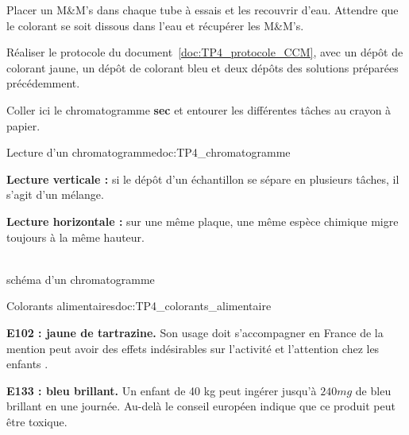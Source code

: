 \mesure
Placer un M\&M's dans chaque tube à essais et les recouvrir d'eau.
Attendre que le colorant se soit dissous dans l'eau et récupérer les M\&M's.

\mesure
Réaliser le protocole du document~\ref{doc:TP4_protocole_CCM}, avec un dépôt de colorant jaune, un dépôt de colorant bleu et deux dépôts des solutions préparées précédemment.

\mesure
Coller ici le chromatogramme \textbf{sec} et entourer les différentes tâches au crayon à papier.
\vspace*{240pt}




\begin{doc}{Lecture d'un chromatogramme}{doc:TP4_chromatogramme}
  \begin{multicols}{2}
    \begin{listePoints}
      \item \textbf{Lecture verticale :} si le dépôt d'un échantillon se sépare en plusieurs tâches, il s'agit d'un mélange.
      \item \textbf{Lecture horizontale :} sur une même plaque, une même espèce chimique migre toujours à la même hauteur.
    \end{listePoints}
    \vfill \strut

    \centering
     \\
    \footnotesize{schéma d'un chromatogramme}
  \end{multicols}
\end{doc}

\begin{doc}{Colorants alimentaires}{doc:TP4_colorants_alimentaire}
  \begin{listePoints}
    \item \textbf{E102 : jaune de tartrazine.} Son usage doit s'accompagner en France de la mention \og peut avoir des effets indésirables sur l'activité et l'attention chez les enfants \fg.
    \item \textbf{E133 : bleu brillant.} Un enfant de 40 kg peut ingérer jusqu'à $240\unit{mg}$ de bleu brillant en une journée. Au-delà le conseil européen indique que ce produit peut être toxique.
  \end{listePoints}
\end{doc}


